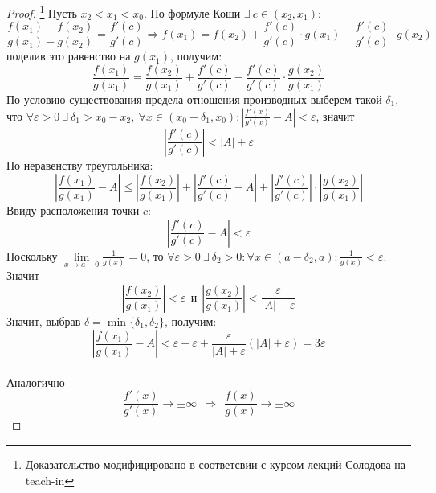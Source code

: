 \documentclass[a4paper, 12pt]{article}
\renewcommand{\epsilon}{\varepsilon}
\theoremstyle{definition}
\begin{document}
        \begin{proof}\footnote{Доказательство модифицировано в соответсвии с курсом лекций Солодова на teach-in}
            Пусть $x_2<x_1<x_0$. По формуле Коши $\exists\ c\in (x_2,x_1)$:
            \[\frac{f(x_1)-f(x_2)}{g(x_1)-g(x_2)}=\frac{f'(c)}{g'(c)} \Rightarrow f(x_1)=f(x_2)+\frac{f'(c)}{g'(c)}\cdot g(x_1)-\frac{f'(c)}{g'(c)}\cdot g(x_2)\]
            поделив это равенство на $g(x_1)$, получим:
            \[\frac{f(x_1)}{g(x_1)}=\frac{f(x_2)}{g(x_1)}+\frac{f'(c)}{g'(c)}-\frac{f'(c)}{g'(c)}\cdot \frac{g(x_2)}{g(x_1)}\]
            По условию существования предела отношения производных выберем такой $\delta_1$, что $\forall \epsilon>0\ \exists\ \delta_1>x_0-x_2,\ \forall x\in (x_0-\delta_1, x_0): |\frac{f'(x)}{g'(x)}-A|<\epsilon$, значит\\
            \[|\frac{f'(c)}{g'(c)}|<|A|+\epsilon\]
            По неравенству треугольника:
            \[|\frac{f(x_1)}{g(x_1)}-A|\leq |\frac{f(x_2)}{g(x_1)}|+|\frac{f'(c)}{g'(c)}-A|+|\frac{f'(c)}{g'(c)}|\cdot |\frac{g(x_2)}{g(x_1)}|\]
            Ввиду расположения точки $c$: \[|\frac{f'(c)}{g'(c)}-A|<\epsilon\]
            Поскольку $\lim\limits_{x\to a-0}\frac{1}{g(x)}=0$, то $\forall \epsilon>0\ \exists\ \delta_2>0: \forall x\in (a-\delta_2, a): \frac{1}{g(x)}<\epsilon$. Значит
            \[|\frac{f(x_2)}{g(x_1)}|<\epsilon\ \ \text{и}\ \ |\frac{g(x_2)}{g(x_1)}|<\frac{\epsilon}{|A|+\epsilon}\]
            Значит, выбрав $\delta = \min\{\delta_1,\delta_2\}$, получим:
            \[|\frac{f(x_1)}{g(x_1)}-A|<\epsilon+\epsilon+\frac{\epsilon}{|A|+\epsilon}(|A|+\epsilon)=3\epsilon\]
            \\
            Аналогично
            \[\frac{f'(x)}{g'(x)}\to \pm \infty\ \ \Rightarrow\ \ \frac{f(x)}{g(x)}\to \pm \infty\]
            
        \end{proof} 
\end{document}
